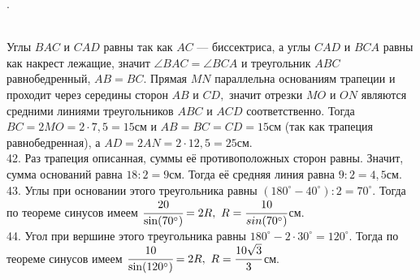 \documentclass[12pt]{article}
\begin{document}
. \begin{figure}[ht!]
\end{figure}\\
Углы $BAC$ и $CAD$ равны так как $AC$ --- биссектриса, а углы $CAD$ и $BCA$ равны как накрест лежащие, значит $\angle BAC=\angle BCA$ и треугольник $ABC$ равнобедренный, $AB=BC.$ Прямая $MN$ параллельна основаниям трапеции и проходит через середины сторон $AB$ и $CD,$ значит отрезки $MO$ и $ON$ являются средними линиями треугольников $ABC$ и $ACD$ соответственно. Тогда $BC=2MO=2\cdot7,5=15$см и $AB=BC=CD=15$см (так как трапеция равнобедренная), а $AD=2AN=2\cdot12,5=25$см.\\
42. Раз трапеция описанная, суммы её противоположных сторон равны. Значит, сумма оснований равна $18:2=9$см. Тогда её средняя линия равна $9:2=4,5$см.\\
43. Углы при основании этого треугольника равны $(180^\circ-40^\circ):2=70^\circ.$ Тогда по теореме синусов имеем $\cfrac{20}{\sin(70^\circ)}=2R,\ R=\cfrac{10}{sin(70^\circ)}$см.\\
44. Угол при вершине этого треугольника равны $180^\circ-2\cdot30^\circ=120^\circ.$ Тогда по теореме синусов имеем $\cfrac{10}{\sin(120^\circ)}=2R,\ R=\cfrac{10\sqrt{3}}{3}$см.\\
\end{document}
